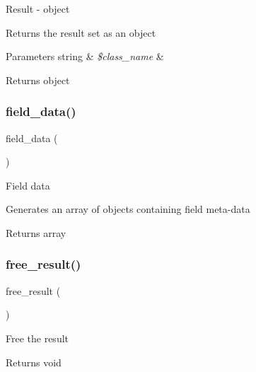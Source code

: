 Result -\/ object

Returns the result set as an object


\begin{DoxyParams}[1]{Parameters}
string & {\em \$class\+\_\+name} & \\
\hline
\end{DoxyParams}
\begin{DoxyReturn}{Returns}
object 
\end{DoxyReturn}
\mbox{\label{class_c_i___d_b__odbc__result_a84bffd65e53902ade1591716749a33e3}} 
\subsubsection{\texorpdfstring{field\+\_\+data()}{field\_data()}}
{\footnotesize\ttfamily field\+\_\+data (\begin{DoxyParamCaption}{ }\end{DoxyParamCaption})}

Field data

Generates an array of objects containing field meta-\/data

\begin{DoxyReturn}{Returns}
array 
\end{DoxyReturn}
\mbox{\label{class_c_i___d_b__odbc__result_aad2d98d6beb3d6095405356c6107b473}} 
\subsubsection{\texorpdfstring{free\+\_\+result()}{free\_result()}}
{\footnotesize\ttfamily free\+\_\+result (\begin{DoxyParamCaption}{ }\end{DoxyParamCaption})}

Free the result

\begin{DoxyReturn}{Returns}
void 
\end{DoxyReturn}
\mbox{\label{class_c_i___d_b__odbc__result_a50b54eb4ea7cfd039740f532988ea776}} 
